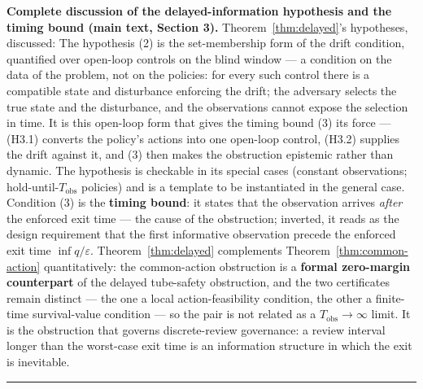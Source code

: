 \documentclass[11pt]{article}
\theoremstyle{definition}
\begin{document}
\bigskip
\noindent\textbf{Complete discussion of the delayed-information hypothesis and the timing bound (main text, Section 3).}
Theorem~\ref{thm:delayed}'s hypotheses, discussed:
The hypothesis (2) is the set-membership form of the drift condition,
quantified over open-loop controls on the blind window --- a condition
on the data of the problem, not on the policies: for every such control
there is a compatible state and disturbance enforcing the drift; the
adversary selects the true state and the disturbance, and the
observations cannot expose the selection in time. It is this open-loop form that gives the timing bound (3) its force --- (H3.1) converts
the policy's actions into one open-loop control, (H3.2) supplies the
drift against it, and (3) then makes the obstruction epistemic rather
than dynamic. The hypothesis is checkable in its special cases (constant
observations; hold-until-\(T_{\mathrm{obs}}\) policies) and is a template to be instantiated in the general case. Condition (3) is
the \textbf{timing bound}: it states that the observation arrives
\emph{after} the enforced exit time --- the cause of the obstruction; inverted, it reads as the design requirement that the first informative observation precede the enforced exit time
\(\inf q / \varepsilon\). Theorem~\ref{thm:delayed} complements Theorem~\ref{thm:common-action} quantitatively:
the common-action obstruction is a \textbf{formal zero-margin counterpart}
of the delayed tube-safety obstruction, and the two certificates remain
distinct --- the one a local action-feasibility condition, the other a
finite-time survival-value condition --- so the pair is not related as a
\(T_{\mathrm{obs}} \to \infty\) limit. It is the obstruction that
governs discrete-review governance: a review interval longer than the
worst-case exit time is an information structure in which the exit is inevitable.
\rule{0.5\linewidth}{0.5pt}
\end{document}
